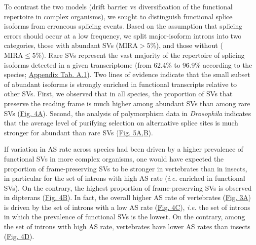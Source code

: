 To contrast the two models (drift barrier vs diversification of the functional repertoire in complex organisms), we sought to distinguish functional splice isoforms from erroneous splicing events. Based on the assumption that splicing errors should occur at a low frequency, we split major-isoform introns into two categories, those with abundant \acrshort{SV}s ($\mathrm{MIRA>5}$\%), and those without ($\mathrm{MIRA\leq5}$\%). Rare \acrshort{SV}s represent the vast majority of the repertoire of splicing isoforms detected in a given transcriptome (from 62.4\% to 96.9\% according to the species; \hyperref[table:1]{Appendix Tab. A.1}). Two lines of evidence indicate that the small subset of abundant isoforms is strongly enriched in functional transcripts relative to other \acrshort{SV}s. First, we observed that in all species, the proportion of \acrshort{SV}s that preserve the reading frame is much higher among abundant \acrshort{SV}s than among rare \acrshort{SV}s (\hyperref[fig:AS4]{Fig. 4A}). Second, the analysis of polymorphism data in \textit{Drosophila} indicates that the average level of purifying selection on alternative splice sites is much stronger for abundant than rare \acrshort{SV}s (\hyperref[fig:AS5]{Fig. 5A,B}). 


If variation in AS rate across species had been driven by a higher prevalence of functional \acrshort{SV}s in more complex organisms, one would have expected the proportion of frame-preserving \acrshort{SV}s to be stronger in vertebrates than in insects, in particular for the set of introns with high AS rate (\textit{i.e.} enriched in functional \acrshort{SV}s). On the contrary, the highest proportion of frame-preserving \acrshort{SV}s is observed in dipterans (\hyperref[fig:AS4]{Fig. 4B}). In fact, the overall higher AS rate of vertebrates (\hyperref[fig:AS3]{Fig. 3A}) is driven by the set of introns with a low AS rate (\hyperref[fig:AS4]{Fig. 4C}), \textit{i.e.} the set of introns in which the prevalence of functional \acrshort{SV}s is the lowest. On the contrary, among the set of introns with high AS rate, vertebrates have lower AS rates than insects (\hyperref[fig:AS4]{Fig. 4D}). 

